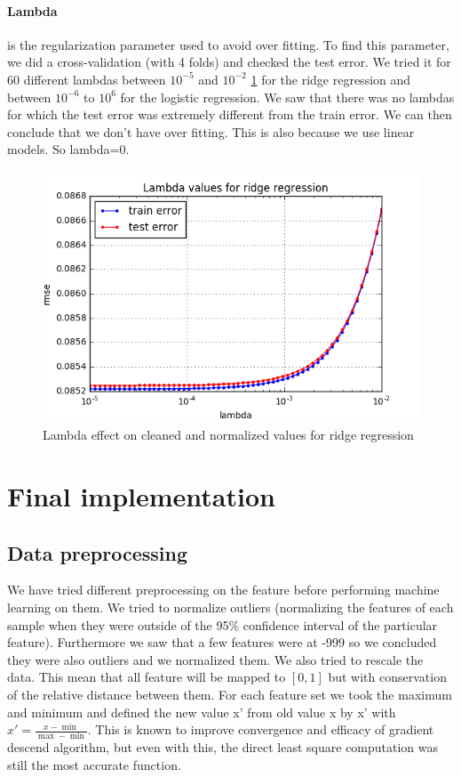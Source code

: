 \documentclass[10pt,conference,compsocconf]{IEEEtran}
\begin{document}
\paragraph{Lambda} is the regularization parameter used to avoid over fitting. To find this parameter, we did a cross-validation (with 4 folds) and checked the test error. We tried it for 60 different lambdas between $10^{-5}$ and $10^{-2}$  \ref{fig1} for the ridge regression and between $10^{-6}$ to $10^6$ for the logistic regression. We saw that there was no lambdas for which the test error was extremely different from the train error. We can then conclude that we don’t have over fitting. This is also because we use linear models. So lambda=0.
\begin{figure}[tbp]
  \centering
  \includegraphics[width=\columnwidth]{Lambda values for ridge regression}
  \caption{Lambda effect on cleaned and normalized values for ridge regression}
  \vspace{-3mm}
  \label{fig1}
\end{figure}
\section{Final implementation}
\subsection{Data preprocessing} We have tried different preprocessing on the feature before performing machine learning on them. We tried to normalize outliers (normalizing the features of each sample when they were outside of the 95\% confidence interval of the particular feature). Furthermore we saw that a few features were at -999 so we concluded they were also outliers and we normalized them.
We also tried to rescale the data. This mean that all feature will be  mapped to \( [0,1] \) but with conservation of the relative distance between them. For each feature set we took the maximum and minimum and defined the new value x' from old value x by x' with $x' = \frac{x-\min}{\max - \min }$. This is known to improve convergence and efficacy of gradient descend algorithm, but even with this, the direct least square computation was still the most accurate function.
\end{document}
